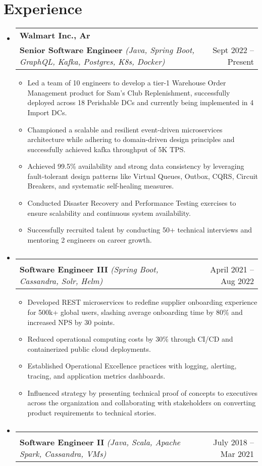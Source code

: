\documentclass[a4paper,10pt]{article}
\makeatletter
\newcommand{\resumeItem}[1]{\item #1}
\newcommand{\resumeSubheading}[4]{
  \vspace{-1pt}\item[]
    \begin{tabular*}{\textwidth}[t]{l@{\extracolsep{\fill}}r}
      \textbf{#1} & #2 \\
      \vspace{2pt}
      {#3} & {#4} \\
    \end{tabular*}\vspace{-5pt}
}
\newcommand{\resumeSubItem}[1]{\resumeItem{#1}\vspace{-4pt}}
\makeatother
\begin{document}
\section{Experience}
\begin{itemize}[leftmargin=0.15in, label={}]
    \resumeSubheading{\large Walmart Inc., Ar}{}{\textcolor{mygray}{\textbf{Senior Software Engineer}} \textit{(Java, Spring Boot, GraphQL, Kafka, Postgres, K8s, Docker)}}{Sept 2022 -- Present}
    \begin{itemize}
        \resumeSubItem{Led a team of 10 engineers to develop a tier-1 Warehouse Order Management product for Sam's Club Replenishment, successfully deployed across 18 Perishable DCs and currently being implemented in 4 Import DCs.}
        \resumeSubItem{Championed a scalable and resilient event-driven microservices architecture while adhering to domain-driven design principles and successfully achieved kafka throughput of 5K TPS. }
        \resumeSubItem{Achieved 99.5\% availability and strong data consistency by leveraging fault-tolerant design patterns like Virtual Queues, Outbox, CQRS, Circuit Breakers, and systematic self-healing measures.}
        \resumeSubItem{Conducted Disaster Recovery and Performance Testing exercises to ensure scalability and continuous system availability.}
        \resumeSubItem{Successfully recruited talent by conducting 50+ technical interviews and mentoring 2 engineers on career growth.}
    \end{itemize}
    \resumeSubheading{}{}{\textcolor{mygray}{\textbf{Software Engineer III}} \textit{(Spring Boot, Cassandra, Solr, Helm)}}{April 2021 -- Aug 2022}
    \begin{itemize}
        \resumeSubItem{Developed REST microservices to redefine supplier onboarding experience for 500k+ global users, slashing average onboarding time by 80\% and increased NPS by 30 points.}
        \resumeSubItem{Reduced operational computing costs by 30\% through CI/CD and containerized public cloud deployments.}
        \resumeSubItem{Established Operational Excellence practices with logging, alerting, tracing, and application metrics dashboards.}
        \resumeSubItem{Influenced strategy by presenting technical proof of concepts to executives across the organization and collaborating with stakeholders on converting product requirements to technical stories.}
    \end{itemize}
    \resumeSubheading{}{}{\textcolor{mygray}{\textbf{Software Engineer II}} \textit{(Java, Scala, Apache Spark, Cassandra, VMs)}}{July 2018 -- Mar 2021}

\end{itemize}
\end{document}
